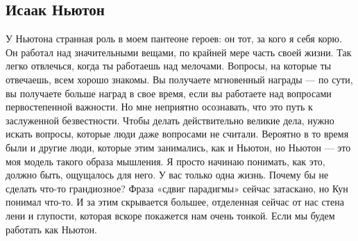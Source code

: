 \documentclass[ebook,12pt,oneside,openany]{memoir}
\begin{document}
\subsection{Исаак Ньютон}

У Ньютона странная роль в моем пантеоне героев: он тот, за кого я себя
корю. Он работал над значительными вещами, по крайней мере часть своей
жизни. Так легко отвлечься, когда ты работаешь над мелочами. Вопросы,
на которые ты отвечаешь, всем хорошо знакомы. Вы получаете мгновенный
награды — по сути, вы получаете больше наград в свое время, если вы
работаете над вопросами первостепенной важности. Но мне неприятно
осознавать, что это путь к заслуженной безвестности. Чтобы делать
действительно великие дела, нужно искать вопросы, которые люди даже
вопросами не считали. Вероятно в то время были и другие люди, которые
этим занимались, как и Ньютон, но Ньютон — это моя модель такого
образа мышления. Я просто начинаю понимать, как это, должно быть,
ощущалось для него. У вас только одна жизнь. Почему бы не сделать
что-то грандиозное? Фраза «сдвиг парадигмы» сейчас затаскано, но Кун
понимал что-то. И за этим скрывается большее, отделенная сейчас от нас
стена лени и глупости, которая вскоре покажется нам очень тонкой. Если
мы будем работать как Ньютон. \newline
\end{document}
